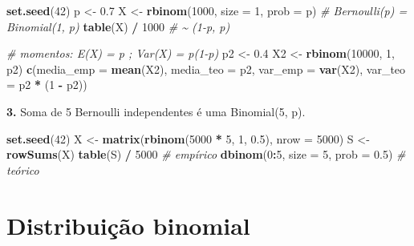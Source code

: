 \documentclass[
  portuguese,
  11pt,
  openany]{book}
\newenvironment{Shaded}{\begin{snugshade}}{\end{snugshade}}
\newcommand{\AttributeTok}[1]{\textcolor[rgb]{0.13,0.29,0.53}{#1}}
\newcommand{\CommentTok}[1]{\textcolor[rgb]{0.56,0.35,0.01}{\textit{#1}}}
\newcommand{\DecValTok}[1]{\textcolor[rgb]{0.00,0.00,0.81}{#1}}
\newcommand{\FloatTok}[1]{\textcolor[rgb]{0.00,0.00,0.81}{#1}}
\newcommand{\FunctionTok}[1]{\textcolor[rgb]{0.13,0.29,0.53}{\textbf{#1}}}
\newcommand{\NormalTok}[1]{#1}
\newcommand{\OtherTok}[1]{\textcolor[rgb]{0.56,0.35,0.01}{#1}}
\newcommand{\SpecialCharTok}[1]{\textcolor[rgb]{0.81,0.36,0.00}{\textbf{#1}}}
\begin{document}
\begin{Shaded}
\begin{Highlighting}[]
\FunctionTok{set.seed}\NormalTok{(}\DecValTok{42}\NormalTok{)}
\NormalTok{p }\OtherTok{\textless{}{-}} \FloatTok{0.7}
\NormalTok{X }\OtherTok{\textless{}{-}} \FunctionTok{rbinom}\NormalTok{(}\DecValTok{1000}\NormalTok{, }\AttributeTok{size =} \DecValTok{1}\NormalTok{, }\AttributeTok{prob =}\NormalTok{ p)   }\CommentTok{\# Bernoulli(p) = Binomial(1, p)}
\FunctionTok{table}\NormalTok{(X) }\SpecialCharTok{/} \DecValTok{1000}                          \CommentTok{\# \textasciitilde{} (1{-}p, p)}

\CommentTok{\# momentos: E(X) = p ; Var(X) = p(1{-}p)}
\NormalTok{p2 }\OtherTok{\textless{}{-}} \FloatTok{0.4}
\NormalTok{X2 }\OtherTok{\textless{}{-}} \FunctionTok{rbinom}\NormalTok{(}\DecValTok{10000}\NormalTok{, }\DecValTok{1}\NormalTok{, p2)}
\FunctionTok{c}\NormalTok{(}\AttributeTok{media\_emp =} \FunctionTok{mean}\NormalTok{(X2), }\AttributeTok{media\_teo =}\NormalTok{ p2,}
  \AttributeTok{var\_emp =} \FunctionTok{var}\NormalTok{(X2), }\AttributeTok{var\_teo =}\NormalTok{ p2 }\SpecialCharTok{*}\NormalTok{ (}\DecValTok{1} \SpecialCharTok{{-}}\NormalTok{ p2))}
\end{Highlighting}
\end{Shaded}

\textbf{3.} Soma de 5 Bernoulli independentes é uma Binomial(5, p).

\begin{Shaded}
\begin{Highlighting}[]
\FunctionTok{set.seed}\NormalTok{(}\DecValTok{42}\NormalTok{)}
\NormalTok{X }\OtherTok{\textless{}{-}} \FunctionTok{matrix}\NormalTok{(}\FunctionTok{rbinom}\NormalTok{(}\DecValTok{5000} \SpecialCharTok{*} \DecValTok{5}\NormalTok{, }\DecValTok{1}\NormalTok{, }\FloatTok{0.5}\NormalTok{), }\AttributeTok{nrow =} \DecValTok{5000}\NormalTok{)}
\NormalTok{S }\OtherTok{\textless{}{-}} \FunctionTok{rowSums}\NormalTok{(X)}
\FunctionTok{table}\NormalTok{(S) }\SpecialCharTok{/} \DecValTok{5000}                          \CommentTok{\# empírico}
\FunctionTok{dbinom}\NormalTok{(}\DecValTok{0}\SpecialCharTok{:}\DecValTok{5}\NormalTok{, }\AttributeTok{size =} \DecValTok{5}\NormalTok{, }\AttributeTok{prob =} \FloatTok{0.5}\NormalTok{)        }\CommentTok{\# teórico}
\end{Highlighting}
\end{Shaded}

\section{Distribuição binomial}\label{distribuiuxe7uxe3o-binomial-1}
\end{document}
